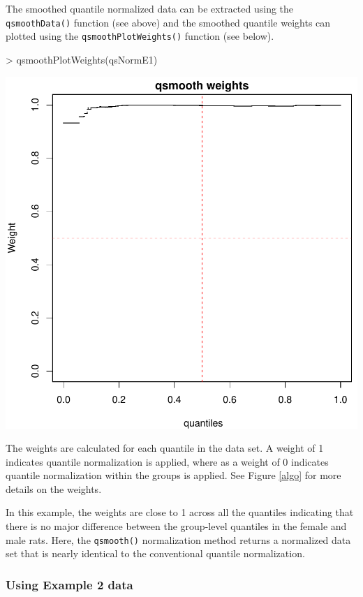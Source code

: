 \documentclass{article}
\begin{document}
The smoothed quantile normalized data can be extracted using the
\texttt{qsmoothData()} function (see above) and the smoothed quantile weights
can plotted using the \texttt{qsmoothPlotWeights()} function (see below).

\begin{Schunk}
\begin{Sinput}
> qsmoothPlotWeights(qsNormE1)
\end{Sinput}
\end{Schunk}
\includegraphics{qsmooth-vignette-plot-qsmooth1-weights}


The weights are calculated for each quantile in the data set.
A weight of 1 indicates quantile normalization is applied,
where as a weight of 0 indicates quantile normalization
within the groups is applied. See Figure \ref{algo} for
more details on the weights.

In this example, the weights are close to 1 across all the
quantiles indicating that there is no major difference
between the group-level quantiles in the female and male rats.
Here, the \texttt{qsmooth()} normalization method returns a
normalized data set that is nearly identical
to the conventional quantile normalization.


\subsubsection{Using Example 2 data}
\end{document}
